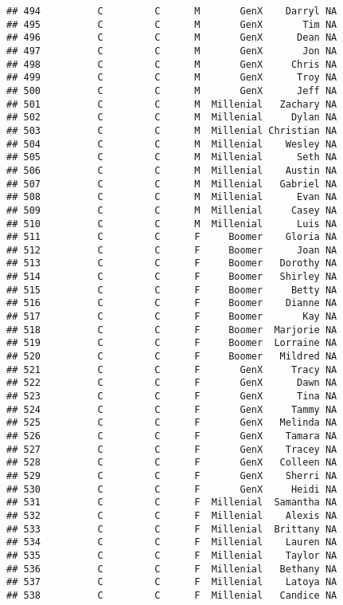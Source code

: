 \documentclass[
]{article}
\begin{document}
\begin{verbatim}
## 494          C         C      M       GenX    Darryl NA
## 495          C         C      M       GenX       Tim NA
## 496          C         C      M       GenX      Dean NA
## 497          C         C      M       GenX       Jon NA
## 498          C         C      M       GenX     Chris NA
## 499          C         C      M       GenX      Troy NA
## 500          C         C      M       GenX      Jeff NA
## 501          C         C      M  Millenial   Zachary NA
## 502          C         C      M  Millenial     Dylan NA
## 503          C         C      M  Millenial Christian NA
## 504          C         C      M  Millenial    Wesley NA
## 505          C         C      M  Millenial      Seth NA
## 506          C         C      M  Millenial    Austin NA
## 507          C         C      M  Millenial   Gabriel NA
## 508          C         C      M  Millenial      Evan NA
## 509          C         C      M  Millenial     Casey NA
## 510          C         C      M  Millenial      Luis NA
## 511          C         C      F     Boomer    Gloria NA
## 512          C         C      F     Boomer      Joan NA
## 513          C         C      F     Boomer   Dorothy NA
## 514          C         C      F     Boomer   Shirley NA
## 515          C         C      F     Boomer     Betty NA
## 516          C         C      F     Boomer    Dianne NA
## 517          C         C      F     Boomer       Kay NA
## 518          C         C      F     Boomer  Marjorie NA
## 519          C         C      F     Boomer  Lorraine NA
## 520          C         C      F     Boomer   Mildred NA
## 521          C         C      F       GenX     Tracy NA
## 522          C         C      F       GenX      Dawn NA
## 523          C         C      F       GenX      Tina NA
## 524          C         C      F       GenX     Tammy NA
## 525          C         C      F       GenX   Melinda NA
## 526          C         C      F       GenX    Tamara NA
## 527          C         C      F       GenX    Tracey NA
## 528          C         C      F       GenX   Colleen NA
## 529          C         C      F       GenX    Sherri NA
## 530          C         C      F       GenX     Heidi NA
## 531          C         C      F  Millenial  Samantha NA
## 532          C         C      F  Millenial    Alexis NA
## 533          C         C      F  Millenial  Brittany NA
## 534          C         C      F  Millenial    Lauren NA
## 535          C         C      F  Millenial    Taylor NA
## 536          C         C      F  Millenial   Bethany NA
## 537          C         C      F  Millenial    Latoya NA
## 538          C         C      F  Millenial   Candice NA

\end{verbatim}
\end{document}
